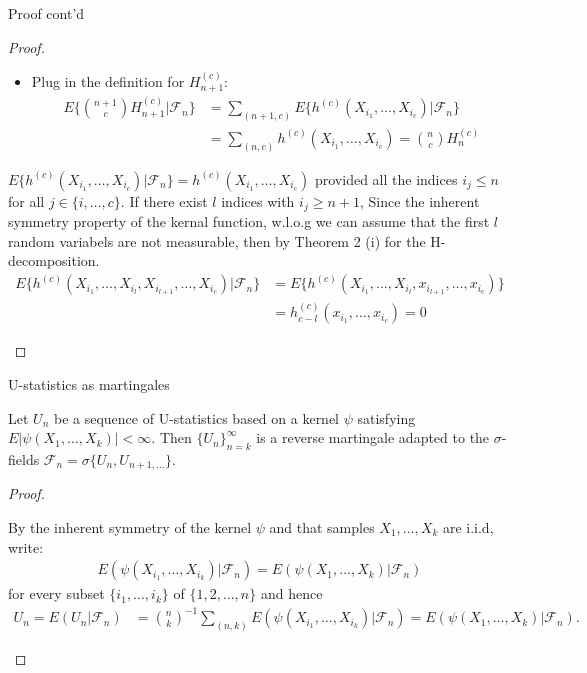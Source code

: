 \documentclass{beamer}
\theoremstyle{definition}
\numberwithin{Def}{section}
\begin{document}
\begin{frame}{Proof cont'd}
\begin{proof}
\begin{fontsize}{9}{12}
\begin{itemize}
    \item Plug in the definition for $H_{n+1}^{(c)}$:
\begin{align*}
E\{{{n+1}\choose c} H_{n+1}^{(c)}|\mathcal{F}_n\}&=
\sum_{(n+1,c)}E\{h^{(c)}(X_{i_1},\dotsc,X_{i_c})|\mathcal{F}_n\}\\
&=\sum_{(n,c)}h^{(c)}(X_{i_1},\dotsc,X_{i_c})={n\choose c}H_n^{(c)}
\end{align*}
\end{itemize}
 $E\{h^{(c)}(X_{i_1},\dotsc,X_{i_c})|\mathcal{F}_n\}=h^{(c)}(X_{i_1},\dotsc,X_{i_c})$ provided all the indices $i_j\le n$ for all $j \in \{i,\dotsc, c\}$. If there exist $l$ indices with $i_j\ge n+1$, Since the inherent symmetry property of the kernal function, w.l.o.g we can assume that the first $l$ random variabels are not measurable, then by Theorem 2 (i) for the H-decomposition.
\begin{align*}
E\{h^{(c)}(X_{i_1},\dotsc,X_{i_l},X_{i_{l+1}},\dotsc, X_{i_c})|\mathcal{F}_n\}&=E\{h^{(c)}(X_{i_1},\dotsc,X_{i_l},x_{i_{l+1}},\dotsc, x_{i_c})\}\\&=h^{(c)}_{c-l}(x_{i_1},\dotsc,x_{i_c})=0
\end{align*}
\end{fontsize}
\end{proof}
\end{frame}

\begin{frame}{U-statistics as martingales}
\begin{theorem}
Let $U_n$ be a sequence of U-statistics based on a kernel $\psi$ satisfying $E|\psi(X_1, \dotsc, X_k)|<\infty$. Then $\{U_n\}_{n=k}^\infty$ is a reverse martingale adapted to the $\sigma$-fields $\mathcal{F}_n=\sigma\{U_n, U_{n+1,\dotsc}\}$.
\end{theorem}
\begin{proof}
\begin{fontsize}{9}{12}
By the inherent symmetry of the kernel $\psi$ and that samples $X_1, \dotsc, X_k$ are i.i.d, write:
\begin{align*}
    E(\psi (X_{i_1}, \dotsc, X_{i_k})|\mathcal{F}_n)=E(\psi (X_1, \dotsc, X_k)|\mathcal{F}_n)
\end{align*}
for every subset $\{i_1, \dotsc, i_k\}$ of $\{1,2,\dotsc,n\}$ and hence 
\begin{align*}
    U_n=E(U_n|\mathcal{F}_n)&={n\choose k}^{-1}\sum_{(n,k)}E(\psi(X_{i_1}, \dotsc,X_{i_k})|\mathcal{F}_n)
    =E(\psi(X_1,\dotsc,X_k)|\mathcal{F}_n).
\end{align*}
\end{fontsize}
\end{proof}
\end{frame}
\end{document}
